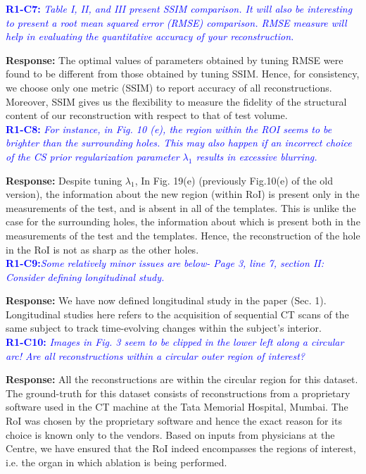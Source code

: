 \documentclass{article}
\begin{document}
\textcolor{blue}{\textbf{R1-C7:}\textit{ Table I, II, and III present SSIM comparison. It will also be interesting to present a root mean squared error (RMSE) comparison. RMSE measure will help in evaluating the quantitative accuracy of your reconstruction.}}

\textbf{Response:} The optimal values of parameters obtained by tuning RMSE were found to be different from those obtained by tuning SSIM. Hence, for consistency, we choose only one metric (SSIM) to report accuracy of all reconstructions.
Moreover, SSIM gives us the flexibility to measure the fidelity of the structural content of our reconstruction with respect to that of test volume.\\ 

\textcolor{blue}{\textbf{R1-C8:}\textit{ For instance, in Fig. 10 (e), the region within the ROI seems to be brighter than the surrounding holes. This may also happen if an incorrect choice of the CS prior regularization parameter $\lambda_1$ results in excessive blurring.}}
  
\textbf{Response:} Despite tuning $\lambda_1$, In Fig. 19(e) (previously Fig.10(e) of the old version), the information about the new region (within RoI)  is present only in the measurements of the test, and is absent in all of the templates. This is unlike the case for the surrounding holes, the information about which is present both in the measurements of the test and the templates. Hence, the reconstruction of the hole in the RoI is not as sharp as the other holes.\\

\textcolor{blue}{\textbf{R1-C9:}\textit{Some relatively minor issues are below- Page 3, line 7, section II: Consider defining longitudinal study.}}
  
\textbf{Response:} We have now defined longitudinal study in the paper (Sec. 1). Longitudinal studies here refers to the acquisition of sequential CT scans of the same subject to track time-evolving changes within the subject's interior.  \\

\textcolor{blue}{\textbf{R1-C10:} \textit{Images in Fig. 3 seem to be clipped in the lower left along a circular arc! Are all reconstructions within a circular outer region of interest?}}

\textbf{Response:} All the reconstructions are within the circular region for this dataset. The ground-truth for this dataset consists of reconstructions from a proprietary software used in the CT machine at the Tata Memorial Hospital, Mumbai. The  RoI was chosen by the proprietary software and hence the exact reason for its choice is known only to the vendors. Based on inputs from physicians at the Centre, we have ensured that the RoI indeed encompasses the regions of interest, i.e. the organ in which ablation is being performed.\\
\end{document}
